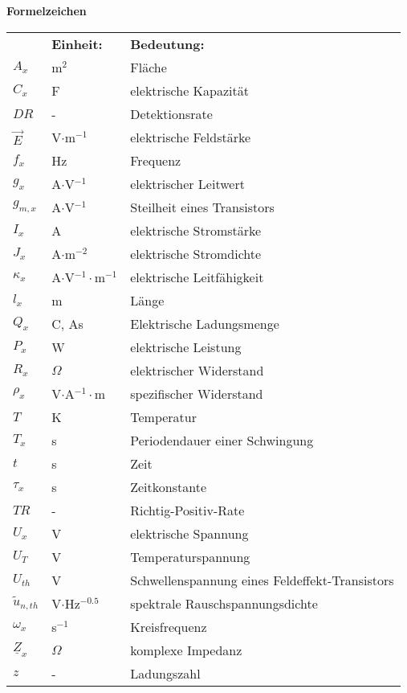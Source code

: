 \textbf{Formelzeichen}
\begin{longtable}{p{1.5cm}p{2.5cm}p{10cm}}
					&\textbf{Einheit:}	& \textbf{Bedeutung:} \\
		$A_x$		& m$^2$				& Fläche\\
		$C_x$		&	F 				& elektrische Kapazität	\\
		$DR$		&	-				& Detektionsrate \\
		$\vec{E}$	& V$\cdot$m$^{-1}$	& elektrische Feldstärke \\
		$f_x$		& Hz				& Frequenz \\
		$g_x$		& A$\cdot$V$^{-1}$ 	& elektrischer Leitwert \\
		$g_{m,x}$	& A$\cdot$V$^{-1}$ 	& Steilheit eines Transistors\\
		$I_x$		&	A				& elektrische Stromstärke \\
		$J_x$		& A$\cdot$m$^{-2}$	& elektrische Stromdichte \\
		$\kappa_{x}$& A$\cdot$V$^{-1}\cdot$m$^{-1}$	& elektrische Leitfähigkeit \\
		$l_x$		& m					& Länge \\
		$Q_x$		&	C, As			& Elektrische Ladungsmenge \\
		$P_x$		&	W 				& elektrische Leistung\\
		$R_x$		&	$\Omega$		& elektrischer Widerstand\\	
		$\rho_x$  & V$\cdot$A$^{-1}\cdot$m     & spezifischer Widerstand \\	
		$T$   	  &	K                   & Temperatur \\
		$T_x$     &	s					& Periodendauer einer Schwingung\\
		$t$		    & s					& Zeit \\
		$\tau_x$    & s	      			& Zeitkonstante \\
		$TR$		& -					& Richtig-Positiv-Rate \\
		$U_x$		&	V				& elektrische Spannung \\
		$U_T$		&	V				& Temperaturspannung \\
		$U_{th}$    & V					& Schwellenspannung eines Feldeffekt-Transistors\\	
		$\tilde{u}_{n,th}$	& V$\cdot$Hz$^{-0.5}$					&	spektrale Rauschspannungsdichte \\
		$\omega_x$	& s$^{-1}$			& Kreisfrequenz \\
		$\underline{Z}_x$ & $\Omega$	& komplexe Impedanz\\
		$z$	        & -					& Ladungszahl				
\end{longtable}	\vspace{-10pt}
